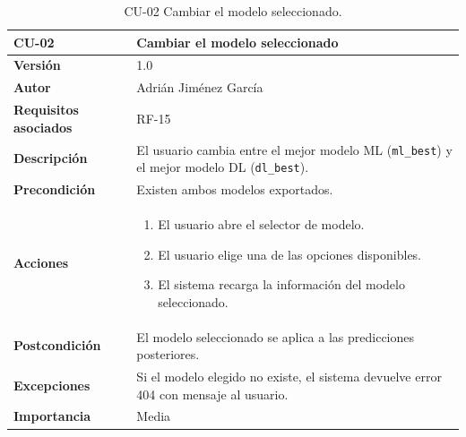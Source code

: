 \begin{table}[p]
	\centering
	\begin{tabularx}{\linewidth}{ p{} X }
		\toprule
		\textbf{CU-02}    & \textbf{Cambiar el modelo seleccionado}\\
		\toprule
		\textbf{Versión}              & 1.0 \\
		\textbf{Autor}                & Adrián Jiménez García \\
		\textbf{Requisitos asociados} & RF-15 \\
		\textbf{Descripción}          & El usuario cambia entre el mejor modelo ML (\texttt{ml\_best}) y el mejor modelo DL (\texttt{dl\_best}). \\
		\textbf{Precondición}         & Existen ambos modelos exportados. \\
		\textbf{Acciones}             &
		\begin{enumerate}
			\def\labelenumi{\arabic{enumi}.}
			\tightlist
			\item El usuario abre el selector de modelo.
			\item El usuario elige una de las opciones disponibles.
			\item El sistema recarga la información del modelo seleccionado.
		\end{enumerate}\\
		\textbf{Postcondición}        & El modelo seleccionado se aplica a las predicciones posteriores. \\
		\textbf{Excepciones}          & Si el modelo elegido no existe, el sistema devuelve error 404 con mensaje al usuario. \\
		\textbf{Importancia}          & Media \\
		\bottomrule
	\end{tabularx}
	\caption{CU-02 Cambiar el modelo seleccionado.}
\end{table}

